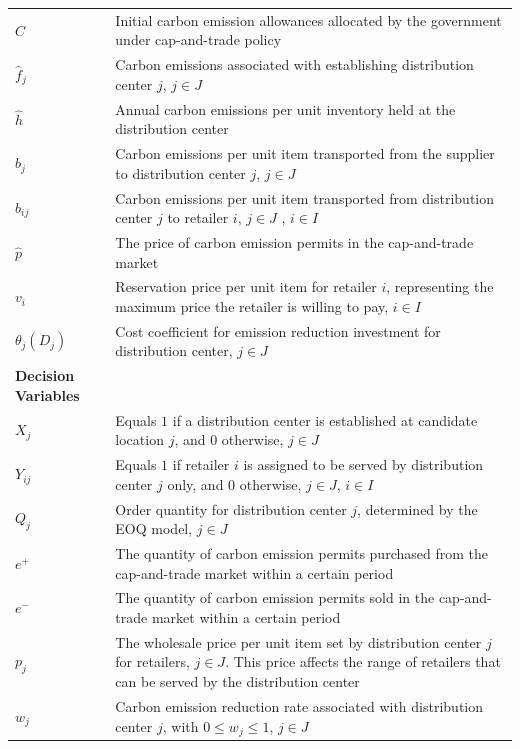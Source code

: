 \documentclass[]{article}
\theoremstyle{plain}%
\theoremstyle{definition}
\theoremstyle{remark}
\theoremstyle{plain}%
\begin{document}
\begin{longtable}{p{3.5cm}p{12cm}}
    $C$ & Initial carbon emission allowances allocated by the government under cap-and-trade policy \\
    $\hat{f}_j$ & Carbon emissions associated with establishing distribution center $j$, $j\in J$ \\
    $\hat{h}$ & Annual carbon emissions per unit inventory held at the distribution center \\
    $\hat{b}_j$ & Carbon emissions per unit item transported from the supplier to distribution center $j$, $j\in J$ \\
    $\hat{b}_{ij}$ & Carbon emissions per unit item transported from distribution center $j$ to retailer $i$,  $j\in J$ , $i\in I$ \\
    $\hat{p}$ & The price of carbon emission permits in the cap-and-trade market \\
    $v_i$ & Reservation price per unit item for retailer $i$, representing the maximum price the retailer is willing to pay, $i\in I$ \\
    $\theta_j(D_j)$ & Cost coefficient for emission reduction investment for distribution center, $j\in J$ \\
    \midrule
    \textbf{Decision Variables} & \\
    $X_j$ & Equals $1$ if a distribution center is established at candidate location $j$, and $0$ otherwise, $j\in J$\\
    $Y_{ij}$ & Equals $1$ if retailer $i$ is assigned to be served by distribution center $j$ only, and $0$ otherwise, $j\in J$, $i\in I$ \\
    $Q_j$ & Order quantity for distribution center $j$, determined by the EOQ model, $j\in J$\\
    $e^+$ & The quantity of carbon emission permits purchased from the cap-and-trade market within a certain period \\
    $e^-$ & The quantity of carbon emission permits sold in the cap-and-trade market within a certain period \\
    $p_j$ & The wholesale price per unit item set by distribution center $j$ for retailers, $j\in J$. This price affects the range of retailers that can be served by the distribution center \\
    $w_j$ & Carbon emission reduction rate associated with distribution center $j$, with $0\leq w_j\leq 1$, $j\in J$ \\
    \bottomrule
    \end{longtable}
    
\end{document}
